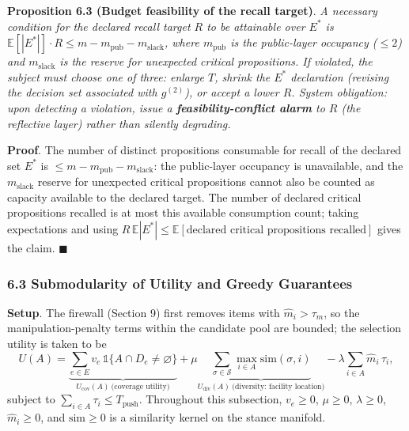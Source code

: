 \documentclass[
  11pt]{article}
\begin{document}
\textbf{Proposition 6.3 (Budget feasibility of the recall target)}.
\emph{A necessary condition for the declared recall target \(R\) to be
attainable over \(E^*\) is
\(\mathbb{E}[|E^*|] \cdot R \le m - m_{\mathrm{pub}} - m_{\mathrm{slack}}\),
where \(m_{\mathrm{pub}}\) is the public-layer occupancy (\(\le 2\)) and
\(m_{\mathrm{slack}}\) is the reserve for unexpected critical
propositions. If violated, the subject must choose one of three: enlarge
\(T\), shrink the \(E^*\) declaration (revising the decision set
associated with \(g^{(2)}\)), or accept a lower \(R\). System
obligation: upon detecting a violation, issue a
\textbf{feasibility-conflict alarm} to \(R\) (the reflective layer)
rather than silently degrading.}

\textbf{Proof}. The number of distinct propositions consumable for
recall of the declared set \(E^*\) is
\(\le m-m_{\mathrm{pub}}-m_{\mathrm{slack}}\): the public-layer
occupancy is unavailable, and the \(m_{\mathrm{slack}}\) reserve for
unexpected critical propositions cannot also be counted as capacity
available to the declared target. The number of declared critical
propositions recalled is at most this available consumption count;
taking expectations and using
\(R\,\mathbb{E}|E^*|\le\mathbb{E}[\text{declared critical propositions recalled}]\)
gives the claim. \(\blacksquare\)

\subsubsection{6.3 Submodularity of Utility and Greedy
Guarantees}\label{submodularity-of-utility-and-greedy-guarantees}

\textbf{Setup}. The firewall (Section 9) first removes items with
\(\hat m_i > \tau_m\), so the manipulation-penalty terms within the
candidate pool are bounded; the selection utility is taken to be
\[U(A) = \underbrace{\sum_{e \in E} v_e\, \mathbb{1}\{A \cap D_e \ne \varnothing\}}_{U_{\mathrm{cov}}(A)\ \text{(coverage utility)}} + \mu \underbrace{\sum_{\sigma \in \mathcal{S}} \max_{i \in A} \mathrm{sim}(\sigma, i)}_{U_{\mathrm{div}}(A)\ \text{(diversity: facility location)}} - \lambda \sum_{i \in A} \hat m_i\, \tau_i,\]
subject to \(\sum_{i \in A} \tau_i \le T_{\mathrm{push}}\). Throughout
this subsection, \(v_e\ge0\), \(\mu\ge0\), \(\lambda\ge0\),
\(\hat m_i\ge0\), and \(\mathrm{sim}\ge0\) is a similarity kernel on the
stance manifold.
\end{document}
